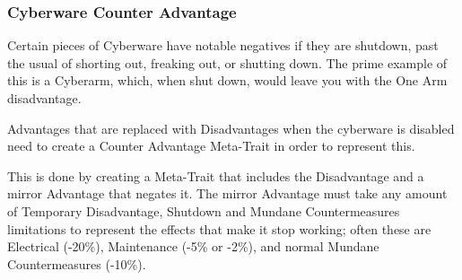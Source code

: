 \begin{multicols*}{3}
%	
%	
%	
	
	\subsubsection{Cyberware Counter Advantage}
	
	Certain pieces of Cyberware have notable negatives if they are shutdown, past the usual of shorting out, freaking out, or shutting down. The prime example of this is a Cyberarm, which, when shut down, would leave you with the One Arm disadvantage. 
	
	Advantages that are replaced with Disadvantages when the cyberware is disabled need to create a Counter Advantage Meta-Trait in order to represent this.
	
	This is done by creating a Meta-Trait that includes the Disadvantage and a mirror Advantage that negates it. The mirror Advantage must take any amount of Temporary Disadvantage, Shutdown and Mundane Countermeasures limitations to represent the effects that make it stop working; often these are Electrical (-20\%), Maintenance (-5\% or -2\%), and normal Mundane Countermeasures (-10\%).
	

\end{multicols*}
